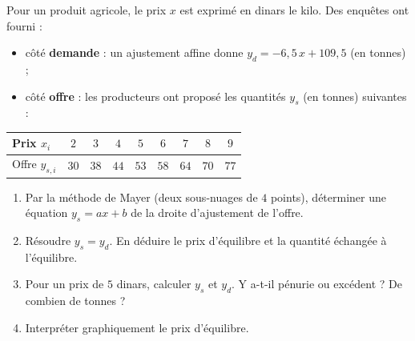 
Pour un produit agricole, le prix $x$ est exprimé en dinars le kilo. Des enquêtes ont fourni :
\begin{itemize}
  \item côté \textbf{demande} : un ajustement affine donne $y_d=-6{,}5\,x+109{,}5$ (en tonnes) ;
  \item côté \textbf{offre} : les producteurs ont proposé les quantités $y_s$ (en tonnes) suivantes :
\end{itemize}
\begin{center}
\begin{tabular}{|l|c|c|c|c|c|c|c|c|}
\hline
Prix $x_i$ & $2$ & $3$ & $4$ & $5$ & $6$ & $7$ & $8$ & $9$ \\ \hline
Offre $y_{s,i}$ & $30$ & $38$ & $44$ & $53$ & $58$ & $64$ & $70$ & $77$ \\ \hline
\end{tabular}
\end{center}

\begin{enumerate}
  \item Par la méthode de Mayer (deux sous-nuages de $4$ points), déterminer une équation $y_s=ax+b$ de la droite d'ajustement de l'offre.
  \item Résoudre $y_s=y_d$. En déduire le prix d'équilibre et la quantité échangée à l'équilibre.
  \item Pour un prix de $5$ dinars, calculer $y_s$ et $y_d$. Y a-t-il pénurie ou excédent ? De combien de tonnes ?
  \item Interpréter graphiquement le prix d'équilibre.
\end{enumerate}

